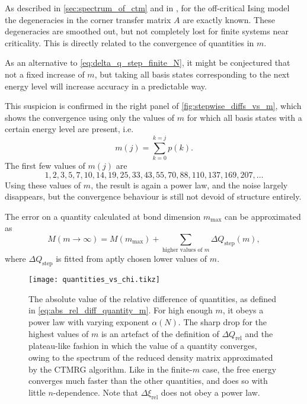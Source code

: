 As described in \autoref{sec:spectrum_of_ctm} and in \cite{okunishi1999universal,
davies1988corner, peschel2009reduced}, for the off-critical Ising model the degeneracies in the corner transfer matrix
$A$ are exactly known.
These degeneracies are smoothed out, but not completely lost for finite systems near criticality. This is directly related to the convergence of quantities in $m$.

As an alternative to \autoref{eq:delta_q_step_finite_N}, it might be conjectured that not a fixed increase of $m$,
but taking all basis states corresponding to the next energy level will increase accuracy in a predictable way.

This suspicion is confirmed in the right panel of \autoref{fig:stepwise_diffs_vs_m},
which shows the convergence using only the values of $m$ for which all basis states with a certain energy level are
present, i.e.
\cite{okunishi1999universal}
\begin{equation}
  m(j) = \sum_{k = 0}^{k = j} p(k).
\end{equation}
The first few values of $m(j)$ are
\begin{equation}\label{eq:m_values_all_degenerate_basis_states}
  1, 2, 3, 5, 7, 10, 14, 19, 25, 33, 43, 55, 70, 88, 110, 137, 169, 207, \dots
\end{equation}
Using these values of $m$, the result is again a power law, and the noise largely disappears, but the convergence
behaviour is still not devoid of structure entirely.

The error on a quantity calculated at bond dimension $m_{\text{max}}$ can be approximated as
\begin{equation}\label{eq:extrapolation_finite_N}
  M(m \to \infty) = M(m_{\text{max}}) + \sum_{\text{higher values of $m$}} \Delta Q_{\text{step}}(m),
\end{equation}
where $\Delta Q_{\text{step}}$ is fitted from aptly chosen lower values of $m$.

\begin{figure}
  \texttt{[image: quantities\_vs\_chi.tikz]}
  \caption{The absolute value of the relative difference of quantities, as defined in \autoref{eq:abs_rel_diff_quantity_m}.
  For high enough $m$, it obeys a power law with varying exponent $\alpha(N)$.
  The sharp drop for the highest values of $m$ is an artefact of the definition of $\Delta Q_{\text{rel}}$ and the
  plateau-like fashion in which the value of a quantity converges,
  owing to the spectrum of the reduced density matrix approximated by the CTMRG algorithm.
  Like in the finite-$m$ case, the free energy converges much faster than the other quantities,
  and does so with little $n$-dependence.
  Note that $\Delta \xi_{\text{rel}}$ does not obey a power law.}\label{fig:quantities_vs_chi}
\end{figure}

